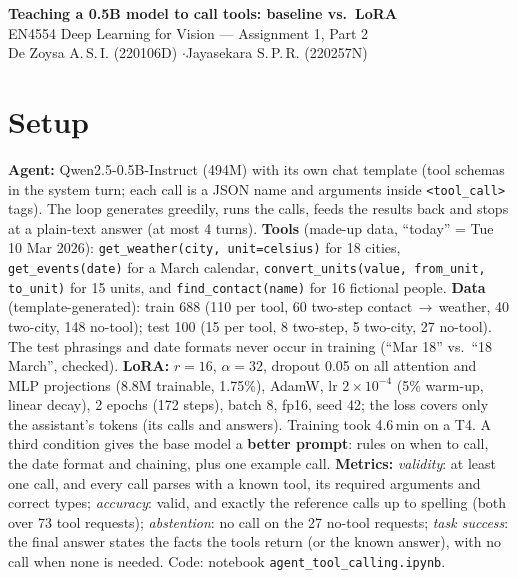 \documentclass[10pt,a4paper]{article}
\newcommand{\tc}[1]{\texttt{\small #1}}
\begin{document}
\begin{center}
{\large\bfseries Teaching a 0.5B model to call tools: baseline vs.\ LoRA}\\[2pt]
{\small EN4554 Deep Learning for Vision --- Assignment 1, Part 2}\\[1pt]
{\small De Zoysa A.\,S.\,I. (220106D) \quad$\cdot$\quad Jayasekara S.\,P.\,R. (220257N)}
\end{center}
\vspace{-8pt}

\section{Setup}
\textbf{Agent:} Qwen2.5-0.5B-Instruct (494M) with its own chat template (tool schemas in the system turn; each call is a JSON name and arguments inside \tc{<tool\_call>} tags). The loop generates greedily, runs the calls, feeds the results back and stops at a plain-text answer (at most 4 turns). \textbf{Tools} (made-up data, ``today'' = Tue 10 Mar 2026): \tc{get\_weather(city, unit=celsius)} for 18 cities, \tc{get\_events(date)} for a March calendar, \tc{convert\_units(value, from\_unit, to\_unit)} for 15 units, and \tc{find\_contact(name)} for 16 fictional people. \textbf{Data} (template-generated): train 688 (110 per tool, 60 two-step contact\,$\to$\,weather, 40 two-city, 148 no-tool); test 100 (15 per tool, 8 two-step, 5 two-city, 27 no-tool). The test phrasings and date formats never occur in training (``Mar 18'' vs.\ ``18 March'', checked). \textbf{LoRA:} $r{=}16$, $\alpha{=}32$, dropout 0.05 on all attention and MLP projections (8.8M trainable, 1.75\%), AdamW, lr $2{\times}10^{-4}$ (5\% warm-up, linear decay), 2 epochs (172 steps), batch 8, fp16, seed 42; the loss covers only the assistant's tokens (its calls and answers). Training took 4.6\,min on a T4. A third condition gives the base model a \textbf{better prompt}: rules on when to call, the date format and chaining, plus one example call. \textbf{Metrics:} \emph{validity}: at least one call, and every call parses with a known tool, its required arguments and correct types; \emph{accuracy}: valid, and exactly the reference calls up to spelling (both over 73 tool requests); \emph{abstention}: no call on the 27 no-tool requests; \emph{task success}: the final answer states the facts the tools return (or the known answer), with no call when none is needed. Code: notebook \texttt{agent\_tool\_calling.ipynb}.
\end{document}
